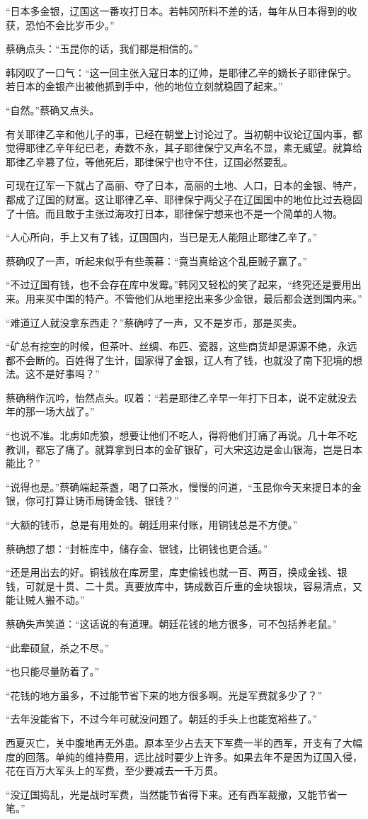 “日本多金银，辽国这一番攻打日本。若韩冈所料不差的话，每年从日本得到的收获，恐怕不会比岁币少。”

蔡确点头：“玉昆你的话，我们都是相信的。”

韩冈叹了一口气：“这一回主张入寇日本的辽帅，是耶律乙辛的嫡长子耶律保宁。若日本的金银产出被他抓到手中，他的地位立刻就稳固了起来。”

“自然。”蔡确又点头。

有关耶律乙辛和他儿子的事，已经在朝堂上讨论过了。当初朝中议论辽国内事，都觉得耶律乙辛年纪已老，寿数不永，其子耶律保宁又声名不显，素无威望。就算给耶律乙辛篡了位，等他死后，耶律保宁也守不住，辽国必然要乱。

可现在辽军一下就占了高丽、夺了日本，高丽的土地、人口，日本的金银、特产，都成了辽国的财富。这让耶律乙辛、耶律保宁两父子在辽国国中的地位比过去稳固了十倍。而且敢于主张过海攻打日本，耶律保宁想来也不是一个简单的人物。

“人心所向，手上又有了钱，辽国国内，当已是无人能阻止耶律乙辛了。”

蔡确叹了一声，听起来似乎有些羡慕：“竟当真给这个乱臣贼子赢了。”

“不过辽国有钱，也不会存在库中发霉。”韩冈又轻松的笑了起来，“终究还是要用出来。用来买中国的特产。不管他们从地里挖出来多少金银，最后都会送到国内来。”

“难道辽人就没拿东西走？”蔡确哼了一声，又不是岁币，那是买卖。

“矿总有挖空的时候，但茶叶、丝绸、布匹、瓷器，这些商货却是源源不绝，永远都不会断的。百姓得了生计，国家得了金银，辽人有了钱，也就没了南下犯境的想法。这不是好事吗？”

蔡确稍作沉吟，怡然点头。叹着：“若是耶律乙辛早一年打下日本，说不定就没去年的那一场大战了。”

“也说不准。北虏如虎狼，想要让他们不吃人，得将他们打痛了再说。几十年不吃教训，都忘了痛了。就算拿到日本的金矿银矿，可大宋这边是金山银海，岂是日本能比？”

“说得也是。”蔡确端起茶盏，喝了口茶水，慢慢的问道，“玉昆你今天来提日本的金银，你可打算让铸币局铸金钱、银钱？”

“大额的钱币，总是有用处的。朝廷用来付账，用铜钱总是不方便。”

蔡确想了想：“封桩库中，储存金、银钱，比铜钱也更合适。”

“还是用出去的好。铜钱放在库房里，库吏偷钱也就一百、两百，换成金钱、银钱，可就是十贯、二十贯。真要放库中，铸成数百斤重的金块银块，容易清点，又能让贼人搬不动。”

蔡确失声笑道：“这话说的有道理。朝廷花钱的地方很多，可不包括养老鼠。”

“此辈硕鼠，杀之不尽。”

“也只能尽量防着了。”

“花钱的地方虽多，不过能节省下来的地方很多啊。光是军费就多少了？”

“去年没能省下，不过今年可就没问题了。朝廷的手头上也能宽裕些了。”

西夏灭亡，关中腹地再无外患。原本至少占去天下军费一半的西军，开支有了大幅度的回落。单纯的维持费用，远比战时要少上许多。如果去年不是因为辽国入侵，花在百万大军头上的军费，至少要减去一千万贯。

“没辽国捣乱，光是战时军费，当然能节省得下来。还有西军裁撤，又能节省一笔。”

